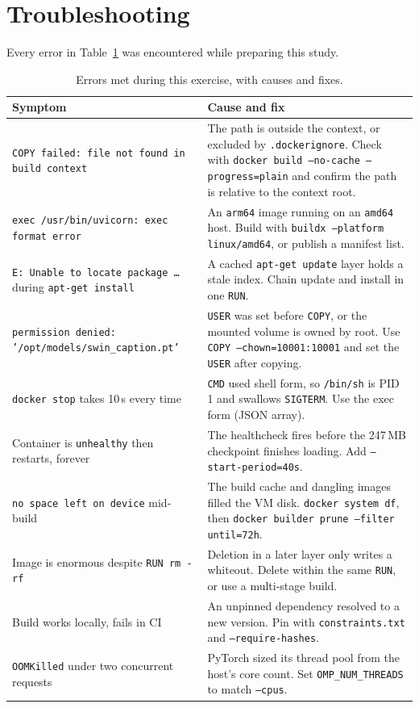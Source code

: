 \documentclass[10pt,a4paper]{article}
\newcommand{\cmd}[1]{\texttt{\small #1}}
\begin{document}
\section{Troubleshooting}

Every error in Table~\ref{tab:trouble} was encountered while preparing
this study.

\begin{table}[htbp]
\centering
\caption{Errors met during this exercise, with causes and fixes.}
\label{tab:trouble}
\footnotesize
\begin{tabularx}{\linewidth}{@{}p{4.6cm} X@{}}
\toprule
\textbf{Symptom} & \textbf{Cause and fix} \\
\midrule
\texttt{COPY failed: file not found in build context}
& The path is outside the context, or excluded by \texttt{.dockerignore}. Check with \cmd{docker build --no-cache --progress=plain} and confirm the path is relative to the context root. \\
\addlinespace
\texttt{exec /usr/bin/uvicorn: exec format error}
& An \texttt{arm64} image running on an \texttt{amd64} host. Build with \cmd{buildx --platform linux/amd64}, or publish a manifest list. \\
\addlinespace
\texttt{E: Unable to locate package \ldots} during \texttt{apt-get install}
& A cached \texttt{apt-get update} layer holds a stale index. Chain update and install in one \texttt{RUN}. \\
\addlinespace
\texttt{permission denied: '/opt/models/swin\_caption.pt'}
& \texttt{USER} was set before \texttt{COPY}, or the mounted volume is owned by root. Use \cmd{COPY --chown=10001:10001} and set the \texttt{USER} after copying. \\
\addlinespace
\texttt{docker stop} takes 10\,s every time
& \texttt{CMD} used shell form, so \texttt{/bin/sh} is PID 1 and swallows \texttt{SIGTERM}. Use the exec form (JSON array). \\
\addlinespace
Container is \texttt{unhealthy} then restarts, forever
& The healthcheck fires before the 247\,MB checkpoint finishes loading. Add \cmd{--start-period=40s}. \\
\addlinespace
\texttt{no space left on device} mid-build
& The build cache and dangling images filled the VM disk. \cmd{docker system df}, then \cmd{docker builder prune --filter until=72h}. \\
\addlinespace
Image is enormous despite \texttt{RUN rm -rf}
& Deletion in a later layer only writes a whiteout. Delete within the same \texttt{RUN}, or use a multi-stage build. \\
\addlinespace
Build works locally, fails in CI
& An unpinned dependency resolved to a new version. Pin with \texttt{constraints.txt} and \texttt{--require-hashes}. \\
\addlinespace
\texttt{OOMKilled} under two concurrent requests
& PyTorch sized its thread pool from the host's core count. Set \texttt{OMP\_NUM\_THREADS} to match \texttt{--cpus}. \\
\bottomrule
\end{tabularx}
\end{table}
\end{document}
